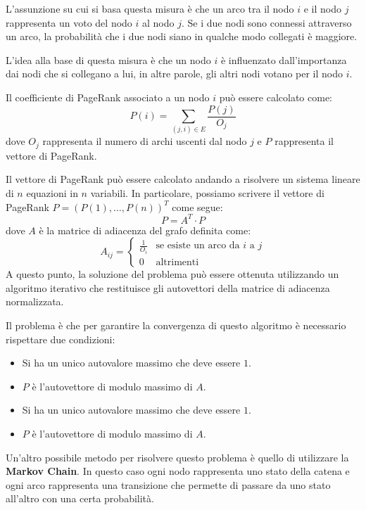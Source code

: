 L'assunzione su cui si basa questa misura è che un arco tra il nodo $i$ e il
nodo $j$ rappresenta un voto del nodo $i$ al nodo $j$. Se i due nodi sono connessi
attraverso un arco, la probabilità che i due nodi siano in qualche modo collegati
è maggiore.

L'idea alla base di questa misura è che un nodo $i$ è influenzato dall'importanza
dai nodi che si collegano a lui, in altre parole, gli altri nodi votano per il
nodo $i$.

Il coefficiente di PageRank associato a un nodo $i$ può essere calcolato come:
\begin{equation}
    P(i) = \sum_{(j, i) \in E} \frac{P(j)}{O_j}
\end{equation}
dove $O_j$ rappresenta il numero di archi uscenti dal nodo $j$ e $P$ rappresenta
il vettore di PageRank.

Il vettore di PageRank può essere calcolato andando a risolvere un sistema
lineare di $n$ equazioni in $n$ variabili. In particolare, possiamo scrivere il
vettore di PageRank $P = (P(1), \dots, P(n))^T$ come segue:
\begin{equation}
    P = A^T \cdot P
\end{equation}
dove $A$ è la matrice di adiacenza del grafo definita come:
\begin{equation*}
    A_{ij} = \begin{cases}
        \frac{1}{O_i} & \text{se esiste un arco da $i$ a $j$} \\
        0             & \text{altrimenti}
    \end{cases}
\end{equation*}
A questo punto, la soluzione del problema può essere ottenuta utilizzando un
algoritmo iterativo che restituisce gli autovettori della matrice di adiacenza
normalizzata.

Il problema è che per garantire la convergenza di questo algoritmo è necessario
rispettare due condizioni:
\begin{itemize}
    \item Si ha un unico autovalore massimo che deve essere $1$.
    \item $P$ è l'autovettore di modulo massimo di $A$.
    \item Si ha un unico autovalore massimo che deve essere $1$.
    \item $P$ è l'autovettore di modulo massimo di $A$.
\end{itemize}

Un'altro possibile metodo per risolvere questo problema è quello di utilizzare
la \textbf{Markov Chain}. In questo caso ogni nodo rappresenta uno stato della
catena e ogni arco rappresenta una transizione che permette di passare da uno
stato all'altro con una certa probabilità.

